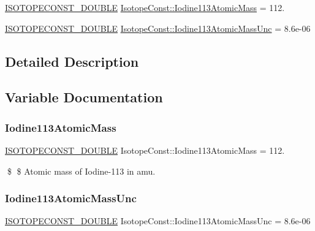\begin{DoxyCompactItemize}
\item 
\mbox{\hyperlink{group___isotope_const-_macros_ga8f45a7272ce02c0b4c65c44636ed719a}{I\+S\+O\+T\+O\+P\+E\+C\+O\+N\+S\+T\+\_\+\+D\+O\+U\+B\+LE}} \mbox{\hyperlink{group___isotope_const-_iodine-_i113_ga367d83175e5607bccfcc267f1e603802}{Isotope\+Const\+::\+Iodine113\+Atomic\+Mass}} = 112.
\item 
\mbox{\hyperlink{group___isotope_const-_macros_ga8f45a7272ce02c0b4c65c44636ed719a}{I\+S\+O\+T\+O\+P\+E\+C\+O\+N\+S\+T\+\_\+\+D\+O\+U\+B\+LE}} \mbox{\hyperlink{group___isotope_const-_iodine-_i113_ga5739a90314da6d3d5057de0615d1d17f}{Isotope\+Const\+::\+Iodine113\+Atomic\+Mass\+Unc}} = 8.\+6e-\/06
\end{DoxyCompactItemize}


\subsection{Detailed Description}


\subsection{Variable Documentation}
\mbox{\label{group___isotope_const-_iodine-_i113_ga367d83175e5607bccfcc267f1e603802}} 
\subsubsection{\texorpdfstring{Iodine113\+Atomic\+Mass}{Iodine113AtomicMass}}
{\footnotesize\ttfamily \mbox{\hyperlink{group___isotope_const-_macros_ga8f45a7272ce02c0b4c65c44636ed719a}{I\+S\+O\+T\+O\+P\+E\+C\+O\+N\+S\+T\+\_\+\+D\+O\+U\+B\+LE}} Isotope\+Const\+::\+Iodine113\+Atomic\+Mass = 112.}

\$ \$ Atomic mass of Iodine-\/113 in amu. \mbox{\label{group___isotope_const-_iodine-_i113_ga5739a90314da6d3d5057de0615d1d17f}} 
\subsubsection{\texorpdfstring{Iodine113\+Atomic\+Mass\+Unc}{Iodine113AtomicMassUnc}}
{\footnotesize\ttfamily \mbox{\hyperlink{group___isotope_const-_macros_ga8f45a7272ce02c0b4c65c44636ed719a}{I\+S\+O\+T\+O\+P\+E\+C\+O\+N\+S\+T\+\_\+\+D\+O\+U\+B\+LE}} Isotope\+Const\+::\+Iodine113\+Atomic\+Mass\+Unc = 8.\+6e-\/06}

